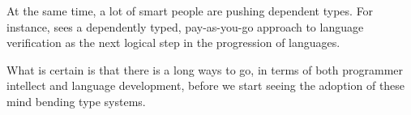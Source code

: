 At the same time, a lot of smart people are pushing dependent types. For instance, \cite{langVeri} sees a dependently typed, pay-as-you-go approach to language verification as the next logical step in the progression of languages.

What is certain is that there is a long ways to go, in terms of both programmer intellect and language development, before we start seeing the adoption of these mind bending type systems.
